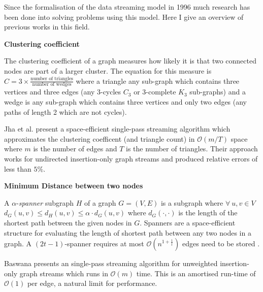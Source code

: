 \documentclass[11pt,twoside,a4paper]{report}
\begin{document}

Since the formalisation of the data streaming model in 1996 much research has been done into solving problems using this model. Here I give an overview of previous works in this field.\newline

\par\noindent\textbf{Clustering coefficient}
\par The clustering coefficient of a graph measures how likely it is that two connected nodes are part of a larger cluster. The equation for this measure is $C=3\times\frac{\text{number of triangles}}{\text{number of wedges}}$ where a triangle any sub-graph which contains three vertices and three edges (\ie any 3-cycles $C_3$ or 3-complete $K_3$ sub-graphs) and a wedge is any sub-graph which contains three vertices and only two edges (\ie any paths of length 2 which are not cycles).
\par Jha et al. \cite{clusteringCofficient} present a space-efficient single-pass streaming algorithm which approximates the clustering coefficent (and triangle count) in $\mathcal{O}(m/T)$ space where $m$ is the number of edges and $T$ is the number of triangles. Their approach works for undirected insertion-only graph streams and produced relative errors of less than $5\%$.\newline

\par\noindent\textbf{Minimum Distance between two nodes}
\par A $\alpha$-\textit{spanner} subgraph $H$ of a graph $G=(V,E)$ is a subgraph where $\forall\ u,v\in V$ $d_G(u,v)\leq d_H(u,v)\leq\alpha\cdot d_G(u,v)$ where $d_G(\cdot,\cdot)$ is the length of the shortest path between the given nodes in $G$. Spanners are a space-efficient structure for evaluating the length of shortest path between any two nodes in a graph. A $(2t-1)$-spanner requires at most $\mathcal{O}(n^{1+\frac1t})$ edges need to be stored \cite{edgesOfSpanner}.
\par Baswana \cite{spanner} presents an single-pass streaming algorithm for unweighted insertion-only graph streams which runs in $\mathcal{O}(m)$ time. This is an amortised run-time of $\mathcal{O}(1)$ per edge, a natural limit for performance.\newline
\end{document}
